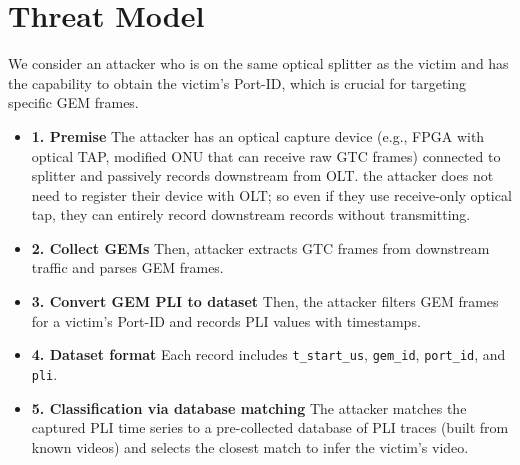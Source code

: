 \documentclass[conference]{IEEEtran}
\begin{document}
\section{Threat Model}
We consider an attacker who is on the same optical splitter as the victim and has the capability to obtain the victim’s Port-ID, which is crucial for targeting specific GEM frames.
\begin{itemize}
  \item \textbf{1. Premise} The attacker has an optical capture device (e.g., FPGA with optical TAP, modified ONU that can receive raw GTC frames) connected to splitter and passively records downstream from OLT.
the attacker does not need to register their device with OLT; so even if they use receive-only optical tap, they can entirely record downstream records without transmitting.
  \item \textbf{2. Collect GEMs} Then, attacker extracts GTC frames from downstream traffic and parses GEM frames. 
  \item \textbf{3. Convert GEM PLI to dataset} Then, the attacker filters GEM frames for a victim's Port-ID and records PLI values with timestamps.
   \item \textbf{4. Dataset format} Each record includes \texttt{t\_start\_us}, \texttt{gem\_id}, \texttt{port\_id}, and \texttt{pli}.
  \item \textbf{5. Classification via database matching} The attacker matches the captured PLI time series to a pre-collected database of PLI traces (built from known videos) and selects the closest match to infer the victim’s video.
\end{itemize}
\end{document}
